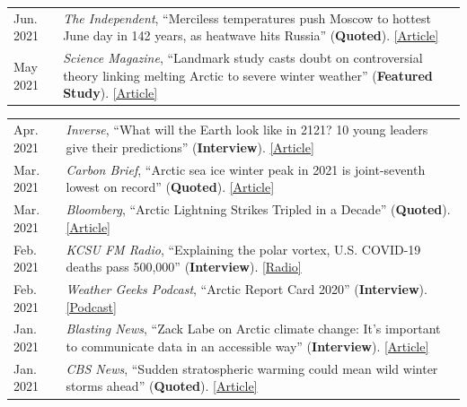 \documentclass[margin,line,palatino,courier,10pt]{res}
\begin{document}
\begin{resume}
\begin{tabular}{@{}p{0.9in}p{4in}}
Jun. 2021 & \textit{The Independent}, ``Merciless temperatures push Moscow to hottest June day in 142 years, as heatwave hits Russia'' (\textbf{Quoted}). \href{https://www.independent.co.uk/climate-change/news/moscow-record-temperature-arctic-heatwave-b1871351.html}{[Article]}\\
May 2021 & \textit{Science Magazine}, ``Landmark study casts doubt on controversial theory linking melting Arctic to severe winter weather'' (\textbf{Featured Study}). \href{https://www.sciencemag.org/news/2021/05/landmark-study-casts-doubt-controversial-theory-linking-melting-arctic-severe-winter}{[Article]}\\
\end{tabular}
\begin{tabular}{@{}p{0.9in}p{4in}}
Apr. 2021 & \textit{Inverse}, ``What will the Earth look like in 2121? 10 young leaders give their predictions'' (\textbf{Interview}). \href{https://www.inverse.com/science/the-future-of-earth-needs-them}{[Article]}\\
Mar. 2021 & \textit{Carbon Brief}, ``Arctic sea ice winter peak in 2021 is joint-seventh lowest on record'' (\textbf{Quoted}). \href{https://www.carbonbrief.org/arctic-sea-ice-winter-peak-in-2021-is-joint-seventh-lowest-on-record}{[Article]}\\
Mar. 2021 & \textit{Bloomberg}, ``Arctic Lightning Strikes Tripled in a Decade'' (\textbf{Quoted}). \href{https://www.bloomberg.com/news/articles/2021-03-23/arctic-lightning-tripled-in-a-decade-climate-change-may-be-to-blame}{[Article]}\\
Feb. 2021 & \textit{KCSU FM Radio}, ``Explaining the polar vortex, U.S. COVID-19 deaths pass 500,000'' (\textbf{Interview}). \href{http://kcsufm.com/2021/02/explaining-the-polar-vortex-u-s-covid-19-deaths-pass-500000/}{[Radio]}\\
Feb. 2021 & \textit{Weather Geeks Podcast}, ``Arctic Report Card 2020'' (\textbf{Interview}). \href{https://podcasts.apple.com/us/podcast/arctic-report-card-2020/id1373312240?i=1000507537964}{[Podcast]}\\
Jan. 2021 & \textit{Blasting News}, ``Zack Labe on Arctic climate change: It's important to communicate data in an accessible way'' (\textbf{Interview}). \href{https://us.blastingnews.com/opinion/2021/01/zack-labe-on-arctic-climate-change-its-important-to-communicate-data-in-an-accessible-way-003267614.html}{[Article]}\\
Jan. 2021 & \textit{CBS News}, ``Sudden stratospheric warming could mean wild winter storms ahead'' (\textbf{Quoted}). \href{https://www.cbsnews.com/news/stratospheric-warming-winter-weather-coming/}{[Article]}\\

\end{tabular}
\end{resume}
\end{document}

